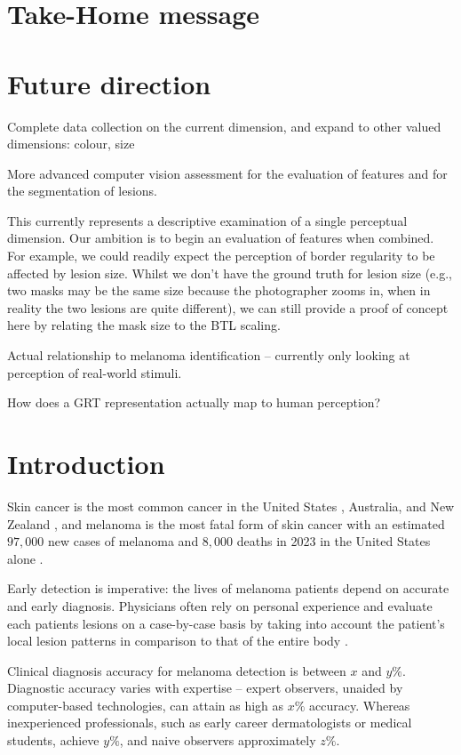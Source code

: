 \documentclass[a4paper, natbib, doc, 12pt]{apa7}
\begin{document}
\section{Take-Home message}


\section{Future direction}
Complete data collection on the current dimension, and expand to other valued dimensions: colour, size

More advanced computer vision assessment for the evaluation of features and for the segmentation of lesions.

This currently represents a descriptive examination of a single perceptual dimension. Our ambition is to begin an evaluation of features when combined. For example, we could readily expect the perception of border regularity to be affected by lesion size. Whilst we don't have the ground truth for lesion size (e.g., two masks may be the same size because the photographer zooms in, when in reality the two lesions are quite different), we can still provide a proof of concept here by relating the mask size to the BTL scaling.

Actual relationship to melanoma identification -- currently only looking at perception of real-world stimuli.

How does a GRT representation actually map to human perception?


\newpage


\section{Introduction}
Skin cancer is the most common cancer in the United States \citep{guy2015vita}, Australia, and New Zealand \citep{perera2015incidence}, and melanoma is the most fatal form of skin cancer with an estimated $97, 000$ new cases of melanoma and $8, 000$ deaths in 2023 in the United States alone \citep{siegel2023cancer}. 

Early detection is imperative: the lives of melanoma patients depend on accurate and early diagnosis. Physicians often rely on personal experience and evaluate each patients lesions on a case-by-case basis by taking into account the patient's local lesion patterns in comparison to that of the entire body \citep{gachon2005first}. 

Clinical diagnosis accuracy for melanoma detection is between $x$ and $y\%$. Diagnostic accuracy varies with expertise -- expert observers, unaided by computer-based technologies, can attain as high as $x\%$ accuracy. Whereas inexperienced professionals, such as early career dermatologists or medical students, achieve $y\%$, and naive observers approximately $z\%$. 
\end{document}
